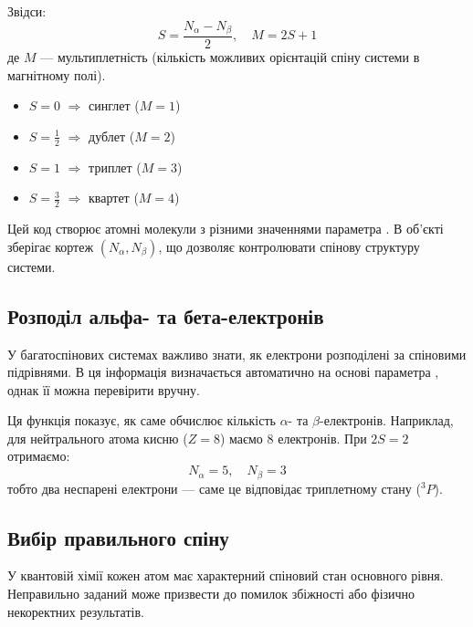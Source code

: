 Звідси:
\[
	S = \frac{N_\alpha - N_\beta}{2}, \quad
	M = 2S + 1
\]
де $M$ --- мультиплетність (кількість можливих орієнтацій спіну системи в магнітному полі).

\begin{itemize}
	\item $S = 0$ $\Rightarrow$ синглет ($M=1$)
	\item $S = \frac{1}{2}$ $\Rightarrow$ дублет ($M=2$)
	\item $S = 1$ $\Rightarrow$ триплет ($M=3$)
	\item $S = \frac{3}{2}$ $\Rightarrow$ квартет ($M=4$)
\end{itemize}


Цей код створює атомні молекули з різними значеннями параметра .
В об’єкті  \PySCF{} зберігає кортеж $(N_\alpha, N_\beta)$, що дозволяє контролювати спінову структуру системи.

\subsection{Розподіл альфа- та бета-електронів}

У багатоспінових системах важливо знати, як електрони розподілені за спіновими підрівнями.
В \PySCF{} ця інформація визначається автоматично на основі параметра , однак її можна перевірити вручну.


Ця функція показує, як саме \PySCF{} обчислює кількість $\alpha$- та $\beta$-електронів.
Наприклад, для нейтрального атома кисню ($Z=8$) маємо 8 електронів.
При $2S=2$ отримаємо:
\[
	N_\alpha = 5,\quad N_\beta = 3
\]
тобто два неспарені електрони --- саме це відповідає триплетному стану (${}^3P$).

\subsection{Вибір правильного спіну}

У квантовій хімії кожен атом має характерний спіновий стан основного рівня.
Неправильно заданий  може призвести до помилок збіжності або
фізично некоректних результатів.

